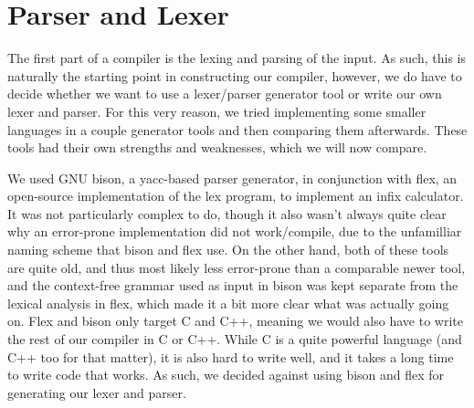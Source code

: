\section{Parser and Lexer}
The first part of a compiler is the lexing and parsing of the input. As such, this is naturally the starting point in constructing our compiler, however, we do have to decide whether we want to use a lexer/parser generator tool or write our own lexer and parser.
For this very reason, we tried implementing some smaller languages in a couple generator tools and then comparing them afterwards. These tools had their own strengths and weaknesses, which we will now compare.

We used GNU bison, a yacc-based parser generator, in conjunction with flex, an open-source implementation of the lex program, to implement an infix calculator. It was not particularly complex to do, though it also wasn't always quite clear why an error-prone implementation did not work/compile, due to the unfamilliar naming scheme that bison and flex use.
On the other hand, both of these tools are quite old, and thus most likely less error-prone than a comparable newer tool, and the context-free grammar used as input in bison was kept separate from the lexical analysis in flex, which made it a bit more clear what was actually going on.
Flex and bison only target C and C++, meaning we would also have to write the rest of our compiler in C or C++. While C is a quite powerful language (and C++ too for that matter), it is also hard to write well, and it takes a long time to write code that works. As such, we decided against using bison and flex for generating our lexer and parser.